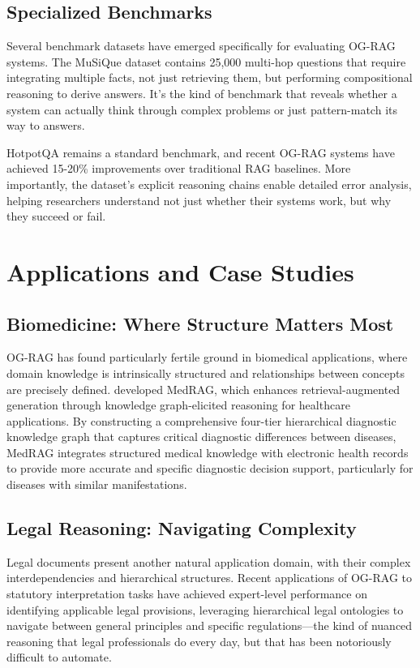 \subsection{Specialized Benchmarks}

Several benchmark datasets have emerged specifically for evaluating OG-RAG systems. The MuSiQue dataset \citep{trivedi2022musique} contains 25,000 multi-hop questions that require integrating multiple facts, not just retrieving them, but performing compositional reasoning to derive answers. It's the kind of benchmark that reveals whether a system can actually think through complex problems or just pattern-match its way to answers.

HotpotQA \citep{yang2018hotpot} remains a standard benchmark, and recent OG-RAG systems have achieved 15-20\% improvements over traditional RAG baselines. More importantly, the dataset's explicit reasoning chains enable detailed error analysis, helping researchers understand not just whether their systems work, but why they succeed or fail.

\section{Applications and Case Studies}

\subsection{Biomedicine: Where Structure Matters Most}

OG-RAG has found particularly fertile ground in biomedical applications, where domain knowledge is intrinsically structured and relationships between concepts are precisely defined. \citet{zhao2025medrag} developed MedRAG, which enhances retrieval-augmented generation through knowledge graph-elicited reasoning for healthcare applications. By constructing a comprehensive four-tier hierarchical diagnostic knowledge graph that captures critical diagnostic differences between diseases, MedRAG integrates structured medical knowledge with electronic health records to provide more accurate and specific diagnostic decision support, particularly for diseases with similar manifestations.

\subsection{Legal Reasoning: Navigating Complexity}

Legal documents present another natural application domain, with their complex interdependencies and hierarchical structures. Recent applications of OG-RAG to statutory interpretation tasks have achieved expert-level performance on identifying applicable legal provisions, leveraging hierarchical legal ontologies to navigate between general principles and specific regulations—the kind of nuanced reasoning that legal professionals do every day, but that has been notoriously difficult to automate.

